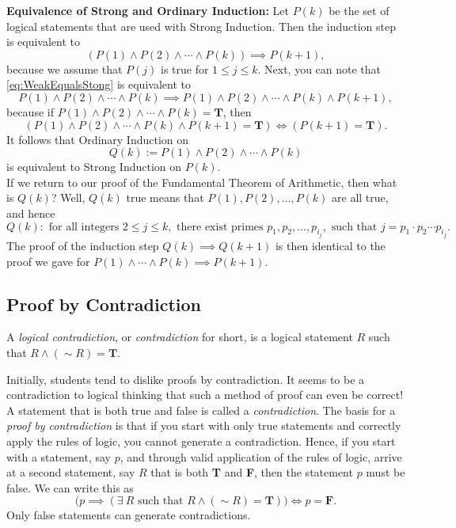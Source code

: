 \textbf{Equivalence of Strong and Ordinary Induction:} Let $P(k)$ be the set of logical statements that are used with Strong Induction. Then the induction step is equivalent to
\begin{equation}
\label{eq:WeakEqualsStong}
   (P(1) \land P(2) \land \cdots \land P(k)) \implies P(k+1), 
\end{equation} 
because we assume that $P(j)$ is true for $1 \le j \le k$. Next, you can note that \eqref{eq:WeakEqualsStong} is equivalent to 
\begin{equation}
\label{eq:WeakEqualsStong02}
   P(1) \land P(2) \land \cdots \land P(k) \implies  P(1) \land P(2) \land \cdots \land P(k) \land P(k+1), 
\end{equation} 
because if $P(1) \land P(2) \land \cdots \land P(k) = \textbf{T}$, then 
$$( P(1) \land P(2) \land \cdots \land P(k) \land P(k+1) = \textbf{T})  \iff (P(k+1) =  \textbf{T}).$$
It follows that Ordinary Induction on 
$$ Q(k):= P(1) \land P(2) \land \cdots \land P(k)$$
is equivalent to Strong Induction on $P(k)$. \\

If we return to our proof of the Fundamental Theorem of Arithmetic, then what is $Q(k)$? Well, $Q(k)$ true means that $P(1), P(2), \ldots, P(k)$ are all true, and hence
$$Q(k): \text{ for all integers } 2 \le j \le k, \text{ there exist primes } p_1, p_2, \ldots, p_{i_j}, \text{ such that } j = p_1 \cdot p_2 \cdots p_{i_j}.$$
The proof of the induction step $Q(k) \implies Q(k+1)$ is then identical to the proof we gave for $P(1) \land \cdots \land P(k) \implies P(k+1).$


\vspace*{.2cm}

\subsection{Proof by Contradiction} 

\begin{definition}
A \emph{logical contradiction}, or \emph{contradiction} for short, is a logical statement $R$ such that $R \land (\sim R) = \textbf{T}$. 
\end{definition} 

Initially, students tend to dislike proofs by contradiction. It seems to be a contradiction to logical thinking that such a method of proof can even be correct! A statement that is both true and false is called a \emph{contradiction}. The basis for a \emph{proof by contradiction} is that if you start with only true statements and correctly apply the rules of logic, you cannot generate a contradiction. Hence, if you start with a statement, say $p$, and through valid application of the rules of logic, arrive at a second statement, say $R$ that is both \textbf{T} and \textbf{F}, then the statement $p$ must be false.  We can write this as
$$ \big( p \implies \left(\exists~R  \text{ such that } R \land (\sim R) = \textbf{T}\right) \big) \iff p = \textbf{F}. $$
Only false statements can generate contradictions.\\

